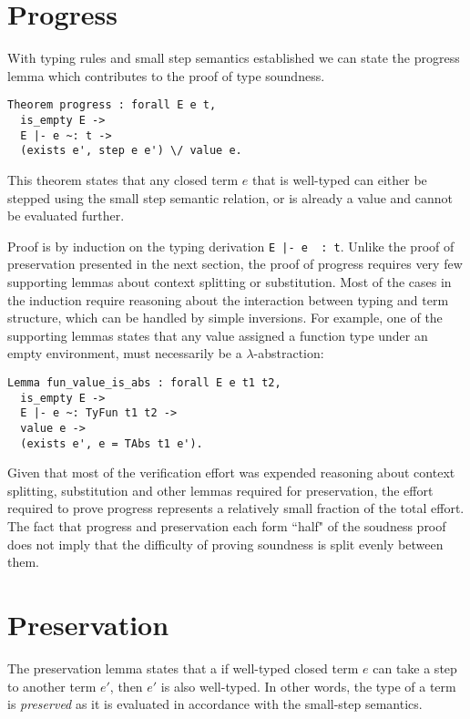 \documentclass[]{unswthesis}
\let\c\texttt
\let\i\textit
\begin{document}
\section{Progress}

With typing rules and small step semantics established we can state the progress lemma which contributes to the proof of type soundness.

\begin{verbatim}
Theorem progress : forall E e t,
  is_empty E ->
  E |- e ~: t ->
  (exists e', step e e') \/ value e.
\end{verbatim}

This theorem states that any closed term $e$ that is well-typed can either be stepped using the small step semantic relation, or is already a value and cannot be evaluated further.

Proof is by induction on the typing derivation \c{E |- e ~: t}. Unlike the proof of preservation presented in the next section, the proof of progress requires very few supporting lemmas about context splitting or substitution. Most of the cases in the induction require reasoning about the interaction between typing and term structure, which can be handled by simple inversions. For example, one of the supporting lemmas states that any value assigned a function type under an empty environment, must necessarily be a $\lambda$-abstraction:

\begin{verbatim}
Lemma fun_value_is_abs : forall E e t1 t2,
  is_empty E ->
  E |- e ~: TyFun t1 t2 ->
  value e ->
  (exists e', e = TAbs t1 e').
\end{verbatim}

Given that most of the verification effort was expended reasoning about context splitting, substitution and other lemmas required for preservation, the effort required to prove progress represents a relatively small fraction of the total effort. The fact that progress and preservation each form ``half" of the soudness proof does not imply that the difficulty of proving soundness is split evenly between them.

\section{Preservation}

The preservation lemma states that a if well-typed closed term $e$ can take a step to another term $e'$, then $e'$ is also well-typed. In other words, the type of a term is \i{preserved} as it is evaluated in accordance with the small-step semantics.
\end{document}
